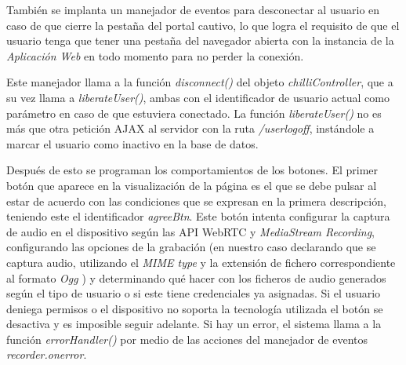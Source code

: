 También se implanta un manejador de eventos para desconectar al usuario en caso de que cierre la pestaña del portal cautivo, lo que logra el requisito de que el usuario tenga que tener una pestaña del navegador abierta con la instancia de la \emph{Aplicación Web} en todo momento para no perder la conexión.


Este manejador llama a la función \emph{disconnect()} del objeto \emph{chilliController}, que a su vez llama a \emph{liberateUser()}, ambas con el identificador de usuario actual como parámetro en caso de que estuviera conectado. La función \emph{liberateUser()} no es más que otra petición AJAX al servidor con la ruta \emph{/userlogoff}, instándole a marcar el usuario como inactivo en la base de datos.


Después de esto se programan los comportamientos de los botones. El primer botón que aparece en la visualización de la página es el que se debe pulsar al estar de acuerdo con las condiciones que se expresan en la primera descripción, teniendo este el identificador \emph{agreeBtn}. Este botón intenta configurar la captura de audio en el dispositivo según las API WebRTC y \emph{MediaStream Recording}, configurando las opciones de la grabación (en nuestro caso declarando que se captura audio, utilizando el \emph{\acrshort{MIME} type} y la extensión de fichero correspondiente al formato \emph{Ogg} \cite{OggRFC1, OggRFC2}) y determinando qué hacer con los ficheros de audio generados según el tipo de usuario o si este tiene credenciales ya asignadas. Si el usuario deniega permisos o el dispositivo no soporta la tecnología utilizada el botón se desactiva y es imposible seguir adelante. Si hay un error, el sistema llama a la función \emph{errorHandler()} por medio de las acciones del manejador de eventos \emph{recorder.onerror}.

